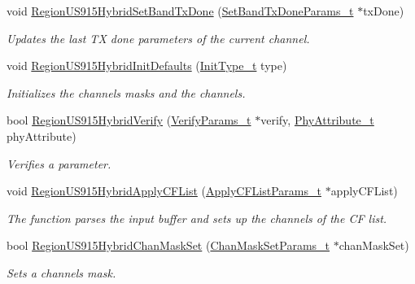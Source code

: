 \begin{DoxyCompactItemize}
void \mbox{\hyperlink{group___r_e_g_i_o_n_u_s915_h_y_b_gaffb1cec48663f7fc2d7aeae9411e3d76}{Region\+U\+S915\+Hybrid\+Set\+Band\+Tx\+Done}} (\mbox{\hyperlink{group___r_e_g_i_o_n_gad0524aa0673c0814a71e7a4f9cade3fc}{Set\+Band\+Tx\+Done\+Params\+\_\+t}} $\ast$tx\+Done)
\begin{DoxyCompactList}\small\item\em Updates the last TX done parameters of the current channel. \end{DoxyCompactList}\item 
void \mbox{\hyperlink{group___r_e_g_i_o_n_u_s915_h_y_b_ga05e578b7048a754fbd73b71d3a938a7f}{Region\+U\+S915\+Hybrid\+Init\+Defaults}} (\mbox{\hyperlink{group___r_e_g_i_o_n_gaddc73ae10673ec925724e7870363bda9}{Init\+Type\+\_\+t}} type)
\begin{DoxyCompactList}\small\item\em Initializes the channels masks and the channels. \end{DoxyCompactList}\item 
bool \mbox{\hyperlink{group___r_e_g_i_o_n_u_s915_h_y_b_ga0fb0094a0833782259c6be87d3d4b141}{Region\+U\+S915\+Hybrid\+Verify}} (\mbox{\hyperlink{group___r_e_g_i_o_n_ga966d97bc2f25df1c09e92e60ef652276}{Verify\+Params\+\_\+t}} $\ast$verify, \mbox{\hyperlink{group___r_e_g_i_o_n_ga9445b07fdf77581ecfaf389970e635f8}{Phy\+Attribute\+\_\+t}} phy\+Attribute)
\begin{DoxyCompactList}\small\item\em Verifies a parameter. \end{DoxyCompactList}\item 
void \mbox{\hyperlink{group___r_e_g_i_o_n_u_s915_h_y_b_gadf2edbcb9c0e296e8de9fe4a40fc96ee}{Region\+U\+S915\+Hybrid\+Apply\+C\+F\+List}} (\mbox{\hyperlink{group___r_e_g_i_o_n_ga71588e9ad07e34b78fa91d51881fd3c6}{Apply\+C\+F\+List\+Params\+\_\+t}} $\ast$apply\+C\+F\+List)
\begin{DoxyCompactList}\small\item\em The function parses the input buffer and sets up the channels of the CF list. \end{DoxyCompactList}\item 
bool \mbox{\hyperlink{group___r_e_g_i_o_n_u_s915_h_y_b_gab7d8969e0b1037572a6703d7995c44e3}{Region\+U\+S915\+Hybrid\+Chan\+Mask\+Set}} (\mbox{\hyperlink{group___r_e_g_i_o_n_ga6d24f7da136006410827dfb29f6b9b9e}{Chan\+Mask\+Set\+Params\+\_\+t}} $\ast$chan\+Mask\+Set)
\begin{DoxyCompactList}\small\item\em Sets a channels mask. \end{DoxyCompactList}\item 

\end{DoxyCompactItemize}
